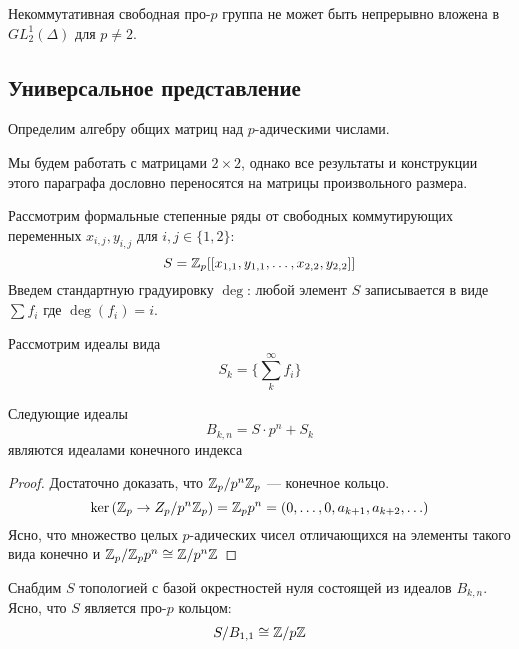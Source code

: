 \begin{theorem}[А.Н.\ Зубков, 1989]
    \label{thm:Zubkov-main}
    Некоммутативная свободная про-$p$ группа не может быть непрерывно вложена в $GL^1_2(\Delta)$ для $p\neq 2$.
\end{theorem}

\subsection{Универсальное представление}\label{subsec:zubkov-universal}
Определим алгебру общих матриц над $p$-адическими числами.

Мы будем работать с матрицами $2\times2$, однако все результаты и конструкции этого параграфа дословно переносятся на матрицы произвольного размера.

Рассмотрим формальные степенные ряды от свободных коммутирующих переменных $x_{i,j}, y_{i,j}$ для $i,j \in \{ 1, 2 \}$:
\[
    S = \mathbb{Z}_{p} [[ x_{1,1}, y_{1,1}, \ldots, x_{2,2}, y_{2,2} ]]
\]
Введем стандартную градуировку $\deg$: любой элемент $S$ записывается в виде $\sum f_i$ где $\deg{(f_i)} = i$.

Рассмотрим идеалы вида
\[
    S_k = \{\sum\limits_k^{\infty} f_i \}
\]

\vskip 0.1in\noindent
\begin{proposition}
    Следующие идеалы
    \[B_{k,n} = S \cdot p^n + S_k \]
    являются идеалами конечного индекса
\end{proposition}
\begin{proof}
    Достаточно доказать, что $\mathbb{Z}_p / p^n\mathbb{Z}_p$ --- конечное кольцо.
    \[
        \ker{(\ensuremath{\mathbb{Z}}_p \to Z_p / p^n\ensuremath{\mathbb{Z}}_p )} = \mathbb{Z}_p p^n = \left( 0,\ldots, 0, a_{k+1}, a_{k+2}, \ldots \right)
    \]
    Ясно, что множество целых $p$-адических чисел отличающихся на элементы такого вида конечно и
    $\mathbb{Z}_p / \mathbb{Z}_p p^n \cong \mathbb{Z} / p^n\mathbb{Z}$
\end{proof}

Снабдим $S$ топологией с базой окрестностей нуля состоящей из идеалов $B_{k,n}$.
Ясно, что $S$ является про-$p$ кольцом:
\[
    S / B_{1,1} \cong \mathbb{Z}/p\mathbb{Z}
\]

